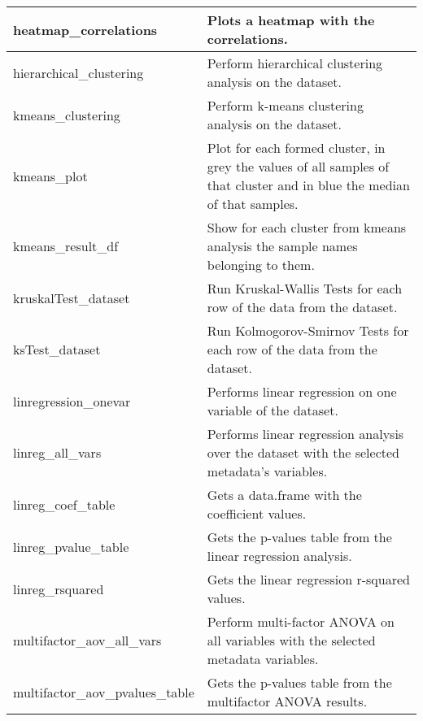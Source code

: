 \begin{scriptsize}
\begin{longtable}{|m{4.3cm}|m{11cm}|}
		\hline
		heatmap\_correlations & Plots a heatmap with the correlations. \\
		
		\hline
		hierarchical\_clustering & Perform hierarchical clustering analysis on the dataset. \\
		
		\hline
		kmeans\_clustering & Perform k-means clustering analysis on the dataset. \\
		
		\hline
		kmeans\_plot & Plot for each formed cluster, in grey the values of all samples of that cluster and in blue the median
		of that samples. \\
		
		\hline
		kmeans\_result\_df & Show for each cluster from kmeans analysis the sample names belonging to them. \\
		
		\hline
		kruskalTest\_dataset & Run Kruskal-Wallis Tests for each row of the data from the dataset. \\
		
		\hline
		ksTest\_dataset & Run Kolmogorov-Smirnov Tests for each row of the data from the dataset. \\
		
		\hline
		linregression\_onevar & Performs linear regression on one variable of the dataset. \\
		
		\hline
		linreg\_all\_vars & Performs linear regression analysis over the dataset with the selected metadata’s variables. \\
		
		\hline
		linreg\_coef\_table & Gets a data.frame with the coefficient values. \\
		
		\hline
		linreg\_pvalue\_table & Gets the p-values table from the linear regression analysis. \\
		
		\hline
		linreg\_rsquared & Gets the linear regression r-squared values. \\
		
		\hline
		multifactor\_aov\_all\_vars & Perform multi-factor ANOVA on all variables with the selected metadata variables. \\
		
		\hline
		multifactor\_aov\_pvalues\_table & Gets the p-values table from the multifactor ANOVA results. \\
		

\end{longtable}
\end{scriptsize}
